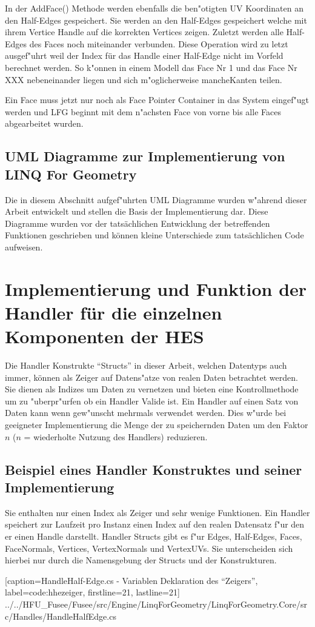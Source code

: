 \documentclass[pagesize, paper=a4, fontsize=12pt,titlepage=true, headings=small, headnosepline, abstractoff, liststotoc, nochapterprefix, plainheadsepline]{scrreprt}
\newcommand{\LFG}{LINQ For Geometry}
\begin{document}
In der AddFace() Methode werden ebenfalls die ben"otigten UV Koordinaten an den Half-Edges gespeichert. Sie werden an den Half-Edges gespeichert welche mit ihrem Vertice Handle auf die korrekten Vertices zeigen. Zuletzt werden alle Half-Edges des Faces noch miteinander verbunden. Diese Operation wird zu letzt ausgef"uhrt weil der Index für das Handle einer Half-Edge nicht im Vorfeld berechnet werden. So k"onnen in einem Modell das Face Nr 1 und das Face Nr XXX nebeneinander liegen und sich m"oglicherweise mancheKanten teilen.

Ein Face muss jetzt nur noch als Face Pointer Container in das System eingef"ugt werden und LFG beginnt mit dem n"achsten Face von vorne bis alle Faces abgearbeitet wurden.

		\subsection {UML Diagramme zur Implementierung von \LFG}
Die in diesem Abschnitt aufgef"uhrten UML Diagramme wurden w"ahrend dieser Arbeit entwickelt und stellen die Basis der Implementierung dar. Diese Diagramme wurden vor der tatsächlichen Entwicklung der betreffenden Funktionen geschrieben und können kleine Unterschiede zum tatsächlichen Code aufweisen.

	\section {Implementierung und Funktion der Handler für die einzelnen Komponenten der HES}
Die Handler Konstrukte "`Structs"' in dieser Arbeit, welchen Datentyps auch immer, können als Zeiger auf Datens"atze von realen Daten betrachtet werden. Sie dienen als Indizes um Daten zu vernetzen und bieten eine Kontrollmethode um zu "uberpr"urfen ob ein Handler Valide ist. Ein Handler auf einen Satz von Daten kann wenn gew"unscht mehrmals verwendet werden. Dies w"urde bei geeigneter Implementierung die Menge der zu speichernden Daten um den Faktor \(n\) (\(n\) = wiederholte Nutzung des Handlers) reduzieren.
		\subsection {Beispiel eines Handler Konstruktes und seiner Implementierung}
Sie enthalten nur einen Index als Zeiger und sehr wenige Funktionen. Ein Handler speichert zur Laufzeit pro Instanz einen Index auf den realen Datensatz f"ur den er einen Handle darstellt. Handler Structs gibt es f"ur Edges, Half-Edges, Faces, FaceNormals, Vertices, VertexNormals und VertexUVs. Sie unterscheiden sich hierbei nur durch die Namensgebung der Structs und der Konstrukturen.

			[caption={HandleHalf-Edge.cs - Variablen Deklaration des "`Zeigers"'}, label=code:hhezeiger, firstline=21, lastline=21]
			{../../HFU_Fusee/Fusee/src/Engine/LinqForGeometry/LinqForGeometry.Core/src/Handles/HandleHalfEdge.cs}
\end{document}
